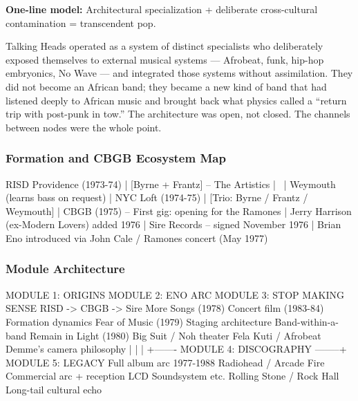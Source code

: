 \documentclass[11pt,letterpaper]{article}
\begin{document}
\textbf{One-line model:} Architectural specialization + deliberate cross-cultural contamination = transcendent pop.

Talking Heads operated as a system of distinct specialists who deliberately exposed themselves to external musical systems --- Afrobeat, funk, hip-hop embryonics, No Wave --- and integrated those systems without assimilation. They did not become an African band; they became a new kind of band that had listened deeply to African music and brought back what physics called a ``return trip with post-punk in tow.'' The architecture was open, not closed. The channels between nodes were the whole point.

\subsubsection{Formation and CBGB Ecosystem Map}

\begin{asciibox}
  RISD Providence (1973-74)
  |
  [Byrne + Frantz] -- The Artistics
  |         \
  |          Weymouth (learns bass on request)
  |
  NYC Loft (1974-75)
  |
  [Trio: Byrne / Frantz / Weymouth]
  |
  CBGB (1975) -- First gig: opening for the Ramones
  |
  Jerry Harrison (ex-Modern Lovers) added 1976
  |
  Sire Records -- signed November 1976
  |
  Brian Eno introduced via John Cale / Ramones concert (May 1977)
\end{asciibox}

\subsubsection{Module Architecture}

\begin{asciibox}
  MODULE 1: ORIGINS          MODULE 2: ENO ARC          MODULE 3: STOP MAKING SENSE
  RISD -> CBGB -> Sire        More Songs (1978)          Concert film (1983-84)
  Formation dynamics          Fear of Music (1979)        Staging architecture
  Band-within-a-band          Remain in Light (1980)      Big Suit / Noh theater
                              Fela Kuti / Afrobeat        Demme's camera philosophy
         |                           |                              |
         +------- MODULE 4: DISCOGRAPHY --------+         MODULE 5: LEGACY
                  Full album arc 1977-1988                Radiohead / Arcade Fire
                  Commercial arc + reception              LCD Soundsystem etc.
                  Rolling Stone / Rock Hall                Long-tail cultural echo
\end{asciibox}
\end{document}
